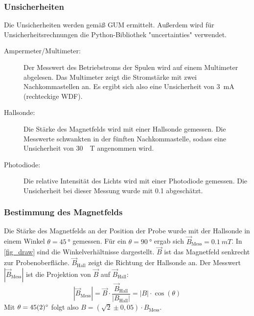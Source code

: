 \documentclass[
	a4paper,
	12pt,
	pagesize,
	ngerman
]{scrartcl}
\begin{document}
	\subsubsection{Unsicherheiten} %
	Die Unsicherheiten werden gemäß GUM ermittelt. 
	Außerdem wird für Unsicherheitsrechnungen die Python-Bibliothek "uncertainties" verwendet.
	\begin{description}
		\item[Ampermeter/Multimeter:] Der Messwert des Betriebstroms der Spulen wird auf einem Multimeter abgelesen. 
			Das Multimeter zeigt die Stromstärke mit zwei Nachkommastellen an. 
			Es ergibt sich also eine Unsicherheit von \SI{3}{mA} (rechteckige WDF).
		\item[Hallsonde:]  Die Stärke des Magnetfelds wird mit einer Hallsonde gemessen. Die Messwerte schwankten in der fünften Nachkommastelle, sodass eine Unsicherheit von \SI{30}{\mu T} angenommen wird.
		\item[Photodiode:]  Die relative Intensität des Lichts wird mit einer Photodiode gemessen. Die Unsicherheit bei dieser Messung wurde mit \SI{0,1}{} abgeschätzt.
	\end{description} 

	\subsubsection{Bestimmung des Magnetfelds} \label{ss_spule}
	Die Stärke des Magnetfelds an der Position der Probe wurde mit der Hallsonde in einem Winkel $\theta=\SI{45}{\degree}$ gemessen. 
	Für ein $\theta=\SI{90}{\degree}$ ergab sich $\vec B_\text{Mess} = \SI{0,1}{mT}$.
	In \cref{fig_draw} sind die Winkelverhältnisse dargestellt. 
	$\vec B$ ist das Magnetfeld senkrecht zur Probenoberfläche. 
	$\vec B_\text{Hall}$ zeigt die Richtung der Hallsonde an.
	Der Messwert $ \left| \vec B_\text{Mess}\right| $ ist die Projektion von $\vec B$ auf $\vec B_\text{Hall}$:
	\begin{equation}
		\left| \vec B_\text{Mess}\right|  = \vec B \cdot \frac{\vec B_\text{Hall}}{\left| B_\text{Hall} \right|} = \left| B \right| \cdot \cos(\theta)
	\end{equation}
	Mit $\theta=\SI{45\pm 2}{\degree}$ folgt also $B = (\sqrt{2}\pm0,05) \cdot B_\text{Mess}$.
\end{document}
